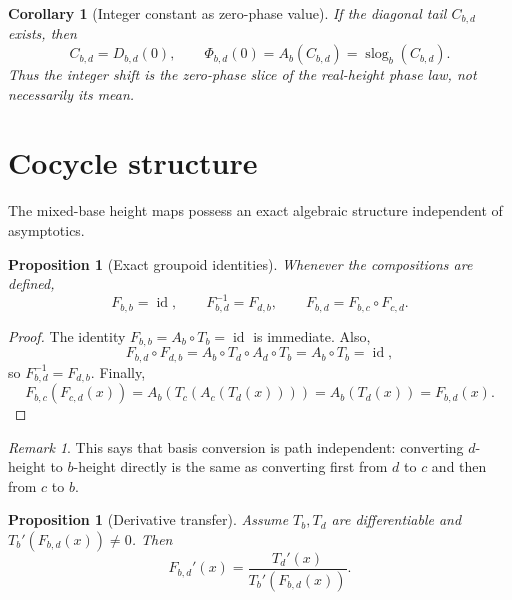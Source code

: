 \documentclass[11pt,a4paper]{article}
\theoremstyle{plain}
\newtheorem{proposition}[theorem]{Proposition}
\newtheorem{corollary}[theorem]{Corollary}
\theoremstyle{definition}
\theoremstyle{remark}
\newtheorem{remark}[theorem]{Remark}
\newcommand{\slog}{\operatorname{slog}}
\newcommand{\id}{\operatorname{id}}
\begin{document}
\begin{corollary}[Integer constant as zero-phase value]\label{cor:zero-phase}
If the diagonal tail $C_{b,d}$ exists, then
\begin{equation}\label{eq:integer-zero-phase}
  C_{b,d}=D_{b,d}(0),\qquad
  \Phi_{b,d}(0)=A_b(C_{b,d})=\slog_b(C_{b,d}).
\end{equation}
Thus the integer shift is the zero-phase slice of the real-height phase law, not necessarily its mean.
\end{corollary}

\section{Cocycle structure}\label{sec:cocycle}

The mixed-base height maps possess an exact algebraic structure independent of asymptotics.

\begin{proposition}[Exact groupoid identities]\label{prop:groupoid}
Whenever the compositions are defined,
\begin{equation}\label{eq:groupoid}
  F_{b,b}=\id,
  \qquad
  F_{b,d}^{-1}=F_{d,b},
  \qquad
  F_{b,d}=F_{b,c}\circ F_{c,d}.
\end{equation}
\end{proposition}

\begin{proof}
The identity $F_{b,b}=A_b\circ T_b=\id$ is immediate.  Also,
\[
  F_{b,d}\circ F_{d,b}=A_b\circ T_d\circ A_d\circ T_b=A_b\circ T_b=\id,
\]
so $F_{b,d}^{-1}=F_{d,b}$.  Finally,
\[
  F_{b,c}(F_{c,d}(x))
  =A_b(T_c(A_c(T_d(x))))=A_b(T_d(x))=F_{b,d}(x).
\]
\end{proof}

\begin{remark}
This says that basis conversion is path independent: converting $d$-height to $b$-height directly is the same as converting first from $d$ to $c$ and then from $c$ to $b$.
\end{remark}

\begin{proposition}[Derivative transfer]\label{prop:derivative-transfer}
Assume $T_b,T_d$ are differentiable and $T_b'(F_{b,d}(x))\ne0$.  Then
\begin{equation}\label{eq:derivative-transfer}
  F_{b,d}'(x)=\frac{T_d'(x)}{T_b'(F_{b,d}(x))}.
\end{equation}
\end{proposition}
\end{document}
